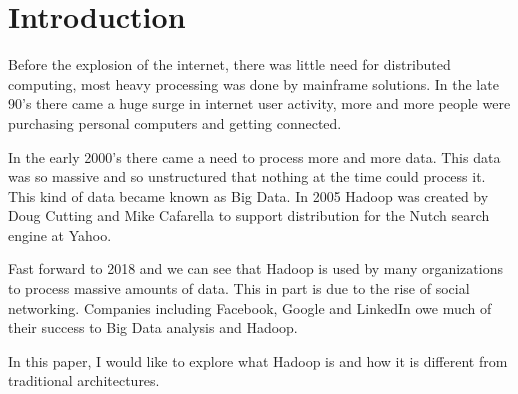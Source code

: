 \section{Introduction}
  
Before the explosion of the internet, there was little need for distributed computing, most heavy processing was done by mainframe solutions. In the late 90's there came a huge surge in internet user activity, more and more people were purchasing personal computers and getting connected.
   
In the early 2000's there came a need to process more and more data. This data was so massive and so unstructured that nothing at the time could process it. This kind of data became known as Big Data. In 2005 Hadoop was created by Doug Cutting and Mike Cafarella to support distribution for the Nutch search engine at Yahoo.

Fast forward to 2018 and we can see that Hadoop is used by many organizations to process massive amounts of data. This in part is due to the rise of social networking. Companies including Facebook, Google and LinkedIn owe much of their success to Big Data analysis and Hadoop.

In this paper, I would like to explore what Hadoop is and how it is different from traditional architectures.